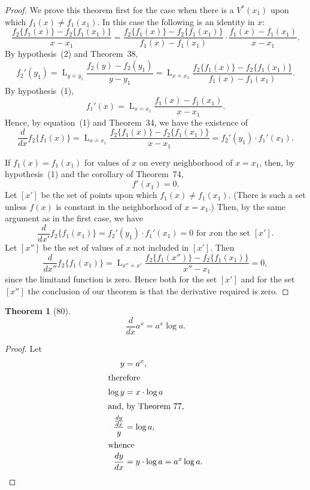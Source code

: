 \documentclass[a4paper,12pt]{book}[2004/02/16]
\providecommand{\hyperlink}[2]{#2}
\providecommand{\hypertarget}[2]{#2}
\theoremstyle{ilemma}
\theoremstyle{itheorem}
\newtheorem{theorem}{Theorem}
\theoremstyle{iother}
\theoremstyle{icorollary}
\theoremstyle{numcorollary}
\theoremstyle{idefinition}
\renewcommand{\dfrac}[2]{\frac{#1}{#2}}%
\begin{document}
\begin{proof}
We prove this theorem first for the case when there is a $V^*(x_1)$
upon which $f_1(x) \neq f_1(x_1)$. In this case the following is an
identity in $x$:
\hypertarget{eq1p126}{\[
  \frac{f_2\{f_1(x)\}-f_2\{f_1(x_1)\} }{ x-x_1 }
= \frac{f_2\{f_1(x)\}-f_2\{f_1(x_1)\} }{ f_1(x)-f_1(x_1) }
\cdot \frac{f_1(x)-f_1(x_1) }{ x-x_1 }.
\tag{1}
\]}
By hypothesis~\hyperlink{item2p126}{(2)} and Theorem~\hyperlink{thm38}{38},
\[
  f_2'(y_1)
= \mathop{L}_{y\doteq y_1} \frac{f_2(y)-f_2(y_1) }{ y-y_1 }
= \mathop{L}_{x\doteq x_1}
    \frac{f_2\{f_1(x)\}-f_2\{f_1(x_1)\} }{ f_1(x)-f_1(x_1) }.
\]
By hypothesis~\hyperlink{item1p126}{(1)},
\[
  f_1'(x)
= \mathop{L}_{x\doteq x_1} \frac{f_1(x)-f_1(x_1) }{ x-x_1 }.
\]
Hence, by equation~\hyperlink{eq1p126}{(1)} and Theorem~\hyperlink{thm34}{34}, we have the existence of
\[
  \frac{d}{dx} f_2\{f_1(x)\}
= \mathop{L}_{x\doteq x_1}
    \frac{f_2\{f_1(x)\}-f_2\{f_1(x_1)\} }{ x-x_1 }
= f_2'(y_1) \cdot f_1'(x_1).
\]

If $f_1(x) = f_1(x_1)$ for values of $x$ on every neighborhood of $x =
x_1$, then, by hypothesis~(1) and the corollary of Theorem~\hyperlink{thm74}{74},
\[
  f'(x_1) = 0.
\]
Let $[x']$ be the set of points upon which $f_1(x)\neq
f_1(x_1)$. (There is such a set unless $f(x)$ is constant in the
neighborhood of $x=x_1$.) Then, by the same argument as in the first
case, we have
\[
  \frac{d}{dx'}f_2\{f_1(x_1)\}=f_2'(y_1)\cdot f_1'(x_1) =0\text{ for $x$
  on the set $[x']$.}
\]
Let $[x'']$ be the set of values of $x$ not included in $[x']$. Then
\[
  \frac{d}{dx''}f_2\{f_1(x_1)\}
= \mathop{L}_{x''\doteq x'} \frac{f_2\{f_1(x'')\}-f_2\{f_1(x_1)\}}{x''-x_1} = 0,
\]
since the limitand function is zero. Hence both for the set $[x']$ and
for the set $[x'']$ the conclusion of our theorem is that the
derivative required is zero.
\end{proof}
\begin{theorem}[80]\hypertarget{thm80}{}
\[
  \frac{d}{dx}a^x=a^x\log a.
\]
\end{theorem}

\begin{proof}
Let
\begin{align*}
  y&=a^x,\\
\intertext{therefore}
  \log y &= x\cdot\log a\\
\intertext{and, by Theorem~\hyperlink{thm77}{77},}
  \frac{\dfrac{dy}{dx}}y&= \log a,\\
\intertext{whence}
  \frac{dy}{dx}&=y\cdot \log a = a^x\log a.\qedhere
\end{align*}
\end{proof}
\end{document}
